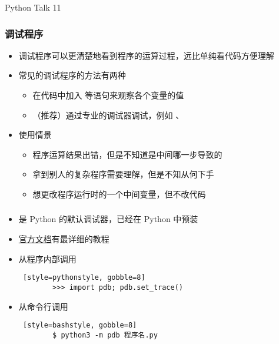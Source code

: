 


\begin{CJK}{UTF8}{gbsn}

\PreFirstFrame
\begin{frame} [fragile]
	\centerline{\fontsize{42}{42}\selectfont Python Talk 11}
\end{frame}
\PostFirstFrame

\begin{frame}
	\frametitle{调试程序}
	\linespread{1.5}
	\begin{itemize}
	\item 调试程序可以更清楚地看到程序的运算过程，远比单纯看代码方便理解
	\item 常见的调试程序的方法有两种
		\begin{itemize}
		\item 在代码中加入  等语句来观察各个变量的值
		\item （推荐）通过专业的调试器调试，例如
				、
		\end{itemize}
	\item 使用情景
		\begin{itemize}
		\item 程序运算结果出错，但是不知道是中间哪一步导致的
		\item 拿到别人的复杂程序需要理解，但是不知从何下手
		\item 想更改程序运行时的一个中间变量，但不改代码
		\end{itemize}
	\end{itemize}
\end{frame}

\begin{frame} [fragile]
	\frametitle{}
	\linespread{1.5}
	\begin{itemize}
	\item {} 是 Python 的默认调试器，已经在 Python 中预装
	\item \href{https://docs.python.org/3/library/pdb.html}{官方文档}有最详细的教程
	\item 从程序内部调用
		\begin{lstlisting} [style=pythonstyle, gobble=8]
		>>> import pdb; pdb.set_trace()
		\end{lstlisting}
	\item 从命令行调用
		\begin{lstlisting} [style=bashstyle, gobble=8]
		$ python3 -m pdb 程序名.py
		\end{lstlisting}
	\end{itemize}
\end{frame}


\end{CJK}
